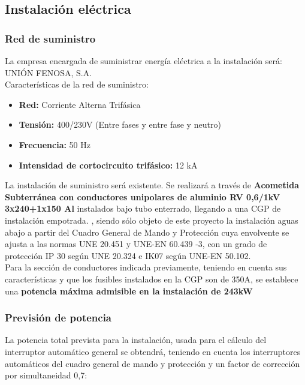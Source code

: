 \subsection{Instalación eléctrica}

\subsubsection{Red de suministro}

La empresa encargada de suministrar energía eléctrica a la instalación será:\\
UNIÓN FENOSA, S.A.\\

Características de la red de suministro:\

\begin{itemize}
\item {\bfseries Red:} Corriente Alterna Trifásica 
\item {\bfseries Tensión:} 400/230V (Entre fases y entre fase y neutro)
\item {\bfseries Frecuencia:} 50 Hz
\item {\bfseries Intensidad de cortocircuito trifásico:} 12 kA
\end{itemize}

La instalación de suministro será existente. Se realizará a través de {\bfseries Acometida Subterránea con conductores unipolares de aluminio RV 0,6/1kV 3x240+1x150 Al} instalados bajo tubo enterrado, llegando a una CGP de instalación empotrada. , siendo sólo objeto de este proyecto la instalación aguas abajo a partir del Cuadro General de Mando y Protección cuya envolvente se ajusta a las normas UNE 20.451 y UNE-EN 60.439 -3, con un grado de protección IP 30 según UNE 20.324 e IK07 según UNE-EN 50.102.\\

Para la sección de conductores indicada previamente, teniendo en cuenta sus características y que los fusibles instalados en la CGP son de 350A, se establece una {\bfseries potencia máxima admisible en la instalación de 243kW}

\subsubsection{Previsión de potencia}

La potencia total prevista para la instalación, usada para el cálculo del interruptor automático general se obtendrá, teniendo en cuenta los interruptores automáticos del cuadro general de mando y protección y un factor de corrección por simultaneidad 0,7:

